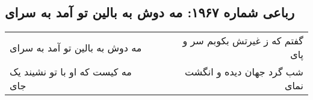 \begin{center}
\section*{رباعی شماره ۱۹۶۷: مه دوش به بالین تو آمد به سرای}
\label{sec:1967}
\begin{longtable}{l p{0.5cm} r}
مه دوش به بالین تو آمد به سرای
&&
گفتم که ز غیرتش بکوبم سر و پای
\\
مه کیست که او با تو نشیند یک جای
&&
شب گرد جهان دیده و انگشت نمای
\\
\end{longtable}
\end{center}
